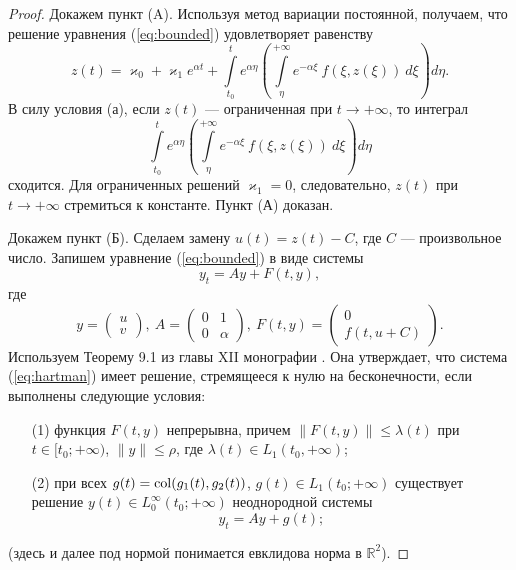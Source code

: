 \begin{proof}
Докажем пункт (A).
Используя метод вариации постоянной, получаем, что решение уравнения (\ref{eq:bounded}) удовлетворяет равенству
%
\begin{equation}
z(t)=\varkappa_0 + \varkappa_1 e^{\alpha t}+\int \limits_{t_0}^t e^{\alpha \eta} \left( \int \limits_\eta^{+\infty} e^{-\alpha\xi}~f(\xi,z(\xi))~d\xi \right)d\eta.
\label{eq:bounded_solution}
\end{equation}
%
В силу условия (а), если $z(t)$ --- ограниченная при $t \to +\infty$, то интеграл
%
\begin{equation}
\int \limits_{t_0}^t e^{\alpha \eta} \left( \int \limits_\eta^{+\infty} e^{-\alpha\xi}~f(\xi,z(\xi))~d\xi \right)d\eta
\end{equation}
%
сходится.
Для ограниченных решений $\varkappa_1 = 0$, следовательно, $z(t)$ при $t \to +\infty$ стремиться к константе.
Пункт (А) доказан.

Докажем пункт (Б).
Сделаем замену $u(t) = z(t) - C$, где $C$ --- произвольное число.
Запишем уравнение (\ref{eq:bounded}) в виде системы
%
\begin{equation}
y_t = Ay + F(t,y),
\label{eq:hartman}
\end{equation}
%
где
%
\begin{equation*}
y =
\begin{pmatrix}
u \\
v
\end{pmatrix},~
A =
\begin{pmatrix}
0 & 1 \\
0 & \alpha
\end{pmatrix},~
F(t,y) =
\begin{pmatrix}
0 \\
f(t, u+C)
\end{pmatrix}.
\end{equation*}
%
Используем Теорему 9.1 из главы XII монографии \cite{Hartman}.
Она утверждает, что система (\ref{eq:hartman}) имеет решение, стремящееся к нулю на бесконечности, если выполнены следующие условия:
%
\begin{itemize}
\item[(1)] функция $F(t,y)$ непрерывна, причем $\|F(t,y)\| \le \lambda(t)$ при $t \in [t_0; +\infty)$, $\|y\| \le \rho$, где $\lambda(t) \in L_1(t_0, +\infty)$;
\item[(2)] при всех $g(t)={\rm col}(g_1(t),g_2(t))$, $g(t) \in L_1(t_0; +\infty)$ существует решение $y(t) \in L_0^{\infty}(t_0;+\infty)$ неоднородной системы
%
\begin{equation}
y_t = Ay + g(t);
\label{eq:hartman_n}
\end{equation}
%
\end{itemize}
%
(здесь и далее под нормой понимается евклидова норма в $\mathbb{R}^2$).


\end{proof}
